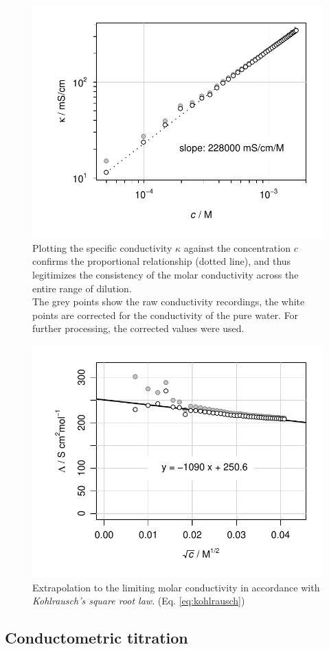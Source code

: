 \begin{figure}[H]
    \centering
    \includegraphics[width=.5\textwidth]{figures/plots/lfk_molar_1.pdf}
    \caption{Plotting the specific conductivity $\kappa$ against the concentration $c$ confirms the proportional relationship (dotted line), and thus legitimizes the consistency of the molar conductivity across the entire range of dilution. \\ The grey points show the raw conductivity recordings, the white points are corrected for the conductivity of the pure water. For further processing, the corrected values were used.}
    \label{fig:lfk_molar_1}
\end{figure}

\begin{figure}[H]
    \centering
    \includegraphics[width=.5\textwidth]{figures/plots/lfk_molar_2.pdf}
    \caption{Extrapolation to the limiting molar conductivity in accordance with \textit{Kohlrausch's square root law}. (Eq. \ref{eq:kohlrausch})}
    \label{fig:lfk_molar_2}
\end{figure}


\subsection{Conductometric titration}

